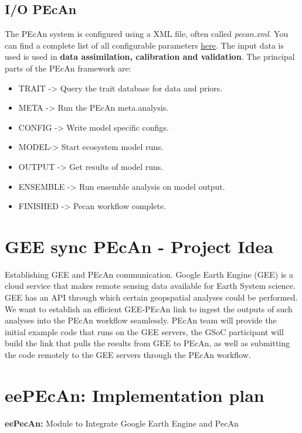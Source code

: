 \documentclass{eepecan}
\begin{document}
	\subsection{I/O PEcAn}
	The PEcAn system is configured using a XML file, often called \emph{pecan.xml}. You can find a complete list of all configurable parameters \href{https://pecanproject.github.io/pecan-documentation/master/pecanXML.html}{here}. The input data is used is used in \textbf{data assimilation, calibration and validation}. The principal parts of the PEcAn framework are:
	
	\begin{itemize}
	\item TRAIT -> Query the trait database for data and priors.
	\item META -> Run the PEcAn meta.analysis.
	\item CONFIG -> Write model specific configs.
	\item MODEL-> Start ecosystem model runs.
	\item OUTPUT ->	Get results of model runs.
	\item ENSEMBLE -> Run ensemble analysis on model output. 
	\item FINISHED -> Pecan workflow complete.
	\end{itemize}
	
	\section{GEE sync PEcAn - Project Idea}
	
	Establishing GEE and PEcAn communication. Google Earth Engine (GEE) is a cloud service that makes remote sensing data available for Earth System science. GEE has an API through which certain geopspatial analyses could be performed. We want to establish an efficient GEE-PEcAn link to ingest the outputs of such analyses into the PEcAn workflow seamlessly. PEcAn team will provide the initial example code that runs on the GEE servers, the GSoC participant will build the link that pulls the results from GEE to PEcAn, as well as submitting the code remotely to the GEE servers through the PEcAn workflow.
	
	\section{eePEcAn: Implementation plan}
	
	\textbf{eePecAn:} Module to Integrate Google Earth Engine and PecAn \newline
	
\end{document}
